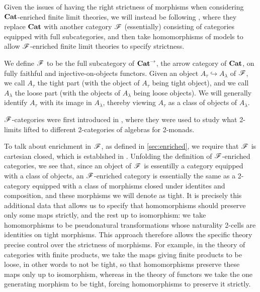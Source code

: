\documentclass[../thesis.tex]{subfiles}
\begin{document}
Given the issues of having the right strictness of morphisms when considering ${\mathbf{Cat}}$-enriched finite
limit theories, we will instead be following \cite{arkor2024}, where they replace ${\mathbf{Cat}}$ with another
category ${\mathscr{F}}$ (essentially) consisting of categories equipped with full subcategories, and then take
homomorphisms of models to allow ${\mathscr{F}}$-enriched finite limit theories to specify strictness.
\begin{definition}\label{def:F}
  We define ${\mathscr{F}}$ to be the full subcategory of ${\mathbf{Cat}}^\to$, the arrow category of ${\mathbf{Cat}}$, on fully faithful and
  injective-on-objects functors. Given an object $A_\tau \hookrightarrow A_\lambda$ of ${\mathscr{F}}$, we call $A_\tau$ the
  tight part (with the object of $A_\tau$ being tight object), and we call $A_\lambda$ the loose part (with the objects
  of $A_\lambda$ being loose objects). We will generally identify $A_\tau$ with its image in $A_\lambda$, thereby
  viewing $A_\tau$ as a class of objects of $A_\lambda$.
\end{definition}
\begin{remark}
  ${\mathscr{F}}$-categories were first introduced in \cite{lack2012}, where they were used to study what 2-limits
  lifted to different 2-categories of algebras for 2-monads.
\end{remark}
To talk about enrichment in ${\mathscr{F}}$, as defined in \cref{sec:enriched}, we require that ${\mathscr{F}}$ is cartesian closed, which is
establshed in \cite[§3.1]{lack2012}. Unfolding the definition of ${\mathscr{F}}$-enriched categories, we see that, since an object
of ${\mathscr{F}}$ is essentilly a category equipped with a class of objects, an ${\mathscr{F}}$-enriched category is essentially the same
as a 2-category equipped with a class of morphisms closed under identites and composition, and these morphisms we
will denote as tight. It is precisely this additional data that allows us to specify that homomorphisms should preserve
only some maps strictly, and the rest up to isomorphism: we take homomorphisms to be pseudonatural transformations whose
naturality 2-cells are identities on tight morphisms. This approach therefore allows the specific theory precise control over
the strictness of morphisms. For example, in the theory of categories with finite products, we take the maps giving finite
products to be loose, in other words to not be tight, so that homomorphisms preserve these maps only up to isomorphism,
whereas in the theory of functors we take the one generating morphism to be tight, forcing homomorphisms to preserve it strictly.
\end{document}
